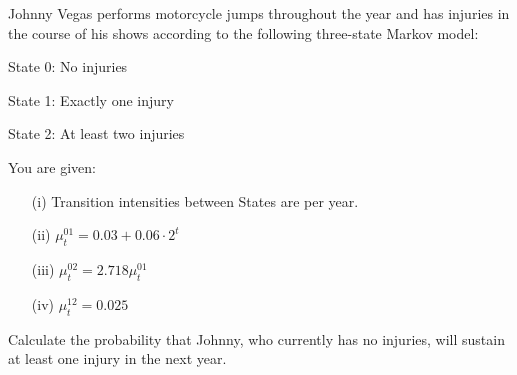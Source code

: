 Johnny Vegas performs motorcycle jumps throughout the year and has injuries in the course of his shows according to the following three-state Markov model:
\begin{description}
\item State 0: No injuries
\item State 1: Exactly one injury
\item State 2: At least two injuries
\end{description}
You are given:
\begin{itemize}
\item[(i)] Transition intensities between States are per year.
\item[(ii)] $\mu_t^{01} = 0.03 +0.06\cdot 2^t$
\item[(iii)] $\mu_t^{02} = 2.718\mu_t^{01}$
\item[(iv)] $\mu_t^{12} = 0.025$
\end{itemize}
Calculate the probability that Johnny, who currently has no injuries, will sustain at least one injury in the next year.

